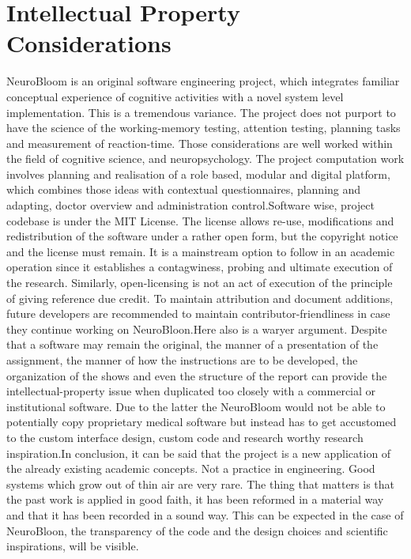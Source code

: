 \documentclass[12pt,a4paper]{report}
\begin{document}
\section{Intellectual Property Considerations}
NeuroBloom is an original software engineering project, which integrates familiar conceptual experience of cognitive activities with a novel system level implementation. This is a tremendous variance. The project does not purport to have the science of the working-memory testing, attention testing, planning tasks and measurement of reaction-time. Those considerations are well worked within the field of cognitive science, and neuropsychology. The project computation work involves planning and realisation of a role based, modular and digital platform, which combines those ideas with contextual questionnaires, planning and adapting, doctor overview and administration control.Software wise, project codebase is under the MIT License. The license allows re-use, modifications and redistribution of the software under a rather open form, but the copyright notice and the license must remain. It is a mainstream option to follow in an academic operation since it establishes a contagwiness, probing and ultimate execution of the research. Similarly, open-licensing is not an act of execution of the principle of giving reference due credit. To maintain attribution and document additions, future developers are recommended to maintain contributor-friendliness in case they continue working on NeuroBloon.Here also is a waryer argument. Despite that a software may remain the original, the manner of a presentation of the assignment, the manner of how the instructions are to be developed, the organization of the shows and even the structure of the report can provide the intellectual-property issue when duplicated too closely with a commercial or institutional software. Due to the latter the NeuroBloom would not be able to potentially copy proprietary medical software but instead has to get accustomed to the custom interface design, custom code and research worthy research inspiration.In conclusion, it can be said that the project is a new application of the already existing academic concepts. Not a practice in engineering. Good systems which grow out of thin air are very rare. The thing that matters is that the past work is applied in good faith, it has been reformed in a material way and that it has been recorded in a sound way. This can be expected in the case of NeuroBloon, the transparency of the code and the design choices and scientific inspirations, will be visible.
\end{document}
